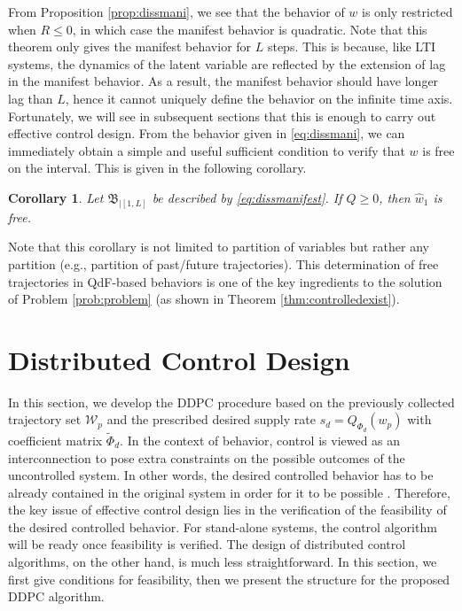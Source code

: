 \documentclass[11pt,print,draftcls,onecolumn,romanappendices]{ieeecolor}
\newtheorem{cor}[thm]{Corollary}
\newcommand{\revise}[1]{{\color{black} #1}}
\newcommand{\B}{\mathfrak{B}}
\newcommand{\bint}[1]{{|[#1]}}
\begin{document}
From Proposition \ref{prop:dissmani}, we see that the behavior of $w$ is only restricted when $R\leq0$, in which case the manifest behavior is quadratic. Note that this theorem only gives the manifest behavior for $L$ steps. This is because, like LTI systems, the dynamics of the latent variable are reflected by the extension of lag in the manifest behavior. As a result, the manifest behavior should have longer lag than $L$, hence it cannot uniquely define the behavior on the infinite time axis. Fortunately, we will see in subsequent sections that this is enough to carry out effective control design. From the behavior given in \eqref{eq:dissmani}, we can immediately obtain a simple and useful sufficient condition to verify that $w$ is free on the interval. This is given in the following corollary.
\begin{cor}\label{cor:dissfree}
	Let $\B_\bint{1,L}$ be described by \eqref{eq:dissmanifest}. If \revise{$Q\geq0$}, then $\hat{w}_1$ is free.
\end{cor}
\revise{Note that this corollary is not limited to partition of variables but rather any partition (e.g., partition of past/future trajectories). This determination of free trajectories in QdF-based behaviors is one of the key ingredients to the solution of Problem \ref{prob:problem} (as shown in Theorem \ref{thm:controlledexist}).}

\section{Distributed Control Design}\label{sec:controldesgin}
In this section, we develop the DDPC procedure based on the previously collected trajectory set $\mathcal{W}_p$ and the prescribed desired supply rate $s_d=Q_{\Phi_d}(w_p)$ with coefficient matrix $\widetilde{\Phi}_d$. In the context of behavior, control is viewed as an interconnection to pose extra constraints on the possible outcomes of the uncontrolled system. In other words, the desired controlled behavior has to be already contained in the original system in order for it to be possible \cite{Willems:2002,Yan:2021}. Therefore, the key issue of effective control design lies in the verification of the feasibility of the desired controlled behavior. For stand-alone systems, the control algorithm will be ready once feasibility is verified. The design of distributed control algorithms, on the other hand, is much less straightforward. In this section, we first give conditions for feasibility, then we present the structure for the proposed DDPC algorithm. 
\end{document}
